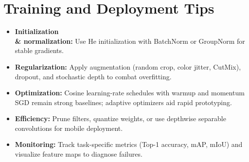 ﻿\documentclass[12pt]{article}
\begin{document}
\section{Training and Deployment Tips}
\begin{itemize}
  \item \textbf{Initialization \\& normalization:} Use He initialization with BatchNorm or GroupNorm for stable gradients.\item \textbf{Regularization:} Apply augmentation (random crop, color jitter, CutMix), dropout, and stochastic depth to combat overfitting.\item \textbf{Optimization:} Cosine learning-rate schedules with warmup and momentum SGD remain strong baselines; adaptive optimizers aid rapid prototyping.\item \textbf{Efficiency:} Prune filters, quantize weights, or use depthwise separable convolutions for mobile deployment.\item \textbf{Monitoring:} Track task-specific metrics (Top-1 accuracy, mAP, mIoU) and visualize feature maps to diagnose failures.\end{itemize}
\end{document}
